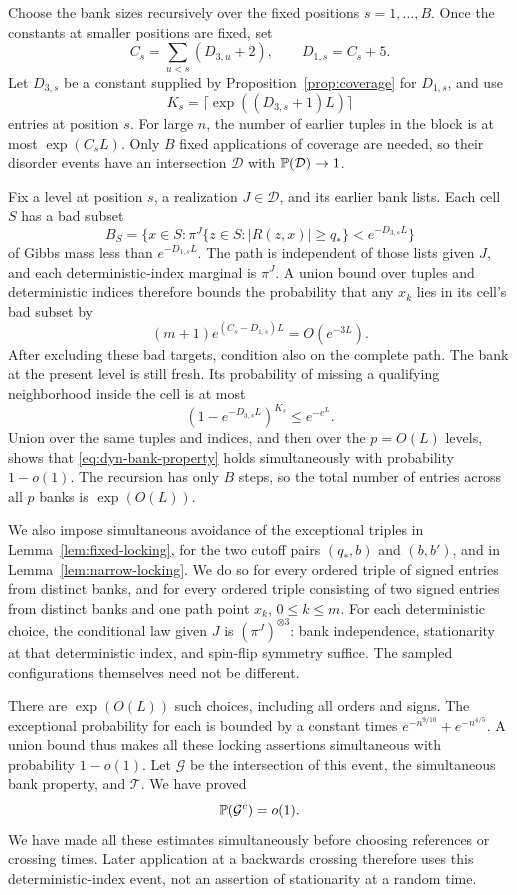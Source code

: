 Choose the bank sizes recursively over the fixed positions
$s=1,\ldots,B$. Once the constants at smaller positions are fixed, set
\[
 C_s=\sum_{u<s}(D_{3,u}+2),\qquad D_{1,s}=C_s+5.
\]
Let $D_{3,s}$ be a constant supplied by
Proposition~\ref{prop:coverage} for $D_{1,s}$, and use
\[
 K_s=\lceil\exp((D_{3,s}+1)L)\rceil
\]
entries at position $s$. For large $n$, the number of earlier tuples in
the block is at most $\exp(C_sL)$. Only $B$ fixed applications of coverage
are needed, so their disorder events have an intersection $\mathcal D$
with $\mathbb P(\mathcal D)\to1$.

Fix a level at position $s$, a realization $J\in\mathcal D$, and its
earlier bank lists. Each cell $S$ has a bad subset
\[
 B_S=\{x\in S:\pi^J\{z\in S:|R(z,x)|\geq q_*\}<e^{-D_{3,s}L}\}
\]
of Gibbs mass less than $e^{-D_{1,s}L}$. The path is independent of those
lists given $J$, and each deterministic-index marginal is $\pi^J$.
A union bound over tuples and deterministic indices therefore bounds the
probability that any $x_k$ lies in its cell's bad subset by
\[
 (m+1)e^{(C_s-D_{1,s})L}=O(e^{-3L}).
\]
After excluding these bad targets, condition also on the complete path.
The bank at the present level is still fresh. Its probability of missing
a qualifying neighborhood inside the cell is at most
\[
 (1-e^{-D_{3,s}L})^{K_s}\leq e^{-e^L}.
\]
Union over the same tuples and indices, and then over the $p=O(L)$
levels, shows that \eqref{eq:dyn-bank-property} holds simultaneously with
probability $1-o(1)$. The recursion has only $B$ steps, so the total number
of entries across all $p$ banks is $\exp(O(L))$.

We also impose simultaneous avoidance of the exceptional triples in
Lemma~\ref{lem:fixed-locking}, for the two cutoff pairs $(q_*,b)$ and
$(b,b')$, and in Lemma~\ref{lem:narrow-locking}. We do so for every
ordered triple of signed entries from distinct banks, and for every
ordered triple consisting of two signed entries from distinct banks and
one path point $x_k$, $0\leq k\leq m$. For each deterministic choice,
the conditional law given $J$ is $(\pi^J)^{\otimes3}$: bank independence,
stationarity at that deterministic index, and spin-flip symmetry suffice.
The sampled configurations themselves need not be different.

There are $\exp(O(L))$ such choices, including all orders and signs.
The exceptional probability for each is bounded by a constant times
$e^{-n^{9/10}}+e^{-n^{4/5}}$. A union bound thus makes all these locking
assertions simultaneous with probability $1-o(1)$. Let $\mathcal G$ be
the intersection of this event, the simultaneous bank property, and
$\mathcal T$. We have proved
\begin{equation}\label{eq:dyn-good-event-prob}
 \mathbb P(\mathcal G^c)=o(1).
\end{equation}
We have made all these estimates simultaneously before choosing references
or crossing times. Later application at a backwards crossing therefore
uses this deterministic-index event, not an assertion of stationarity
at a random time.

